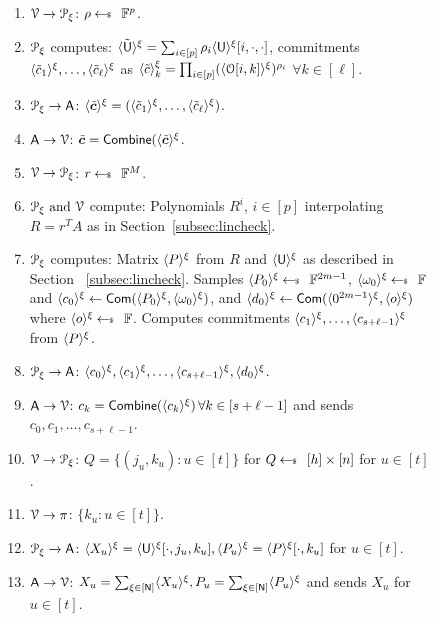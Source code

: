 \begin{figure*}[h!]
{\begin{framed}
			\begin{enumerate}[{\rm 1.}]
				\item $\verifier\rightarrow\distprover$: $\rho\sample \FF^p$.
				\item $\distprover$ computes: $\shr{\tilde{\ewit}} = \sum_{i\in [p]}\rho_i\shr{\ewit}[i,\cdot,\cdot]$, commitments $\shr{\tilde{c}_1},\ldots,\shr{\tilde{c}_\ell}$ as $\shr{\tilde{c}}_k = \prod_{i\in[p]}(\shr{\comoracle[i,k]})^{\rho_i}$ $\forall k\in[\ell]$.
				\item $\distprover\rightarrow\Ag$: $\shr{\tilde{\bm{c}}} = (\shr{\tilde{c}_1},\ldots,\shr{\tilde{c}_\ell})$.
				\item  {$\Ag\rightarrow\verifier$: $\tilde{\bm{c}}=\combine(\shr{\tilde{\bm{c}}}$.} %
				\item $\verifier\rightarrow\distprover$: $r\sample \FF^M$.
				\item $\distprover \text{ and }\verifier$ compute: Polynomials $R^i$, $i\in [p]$ interpolating $R=r^TA$	as in Section~\ref{subsec:lincheck}.
				\item $\distprover$ computes: Matrix $\shr{P}$ from $R$ and $\shr{\ewit}$ as described in Section ~\ref{subsec:lincheck}. Samples $\shr{P_0}\sample \FF^{2m-1}$, $\shr{\omega_0} \sample \FF$ and $\shr{c_0}\gets \comm(\shr{P_0},\shr{\omega_0})$,  and $\shr{d_0}\gets \comm(\shr{0^{2m-1}},\shr{o})$ where $\shr{o} \sample \FF$.
				Computes commitments $\shr{c_1},\ldots,\shr{c_{s+\ell-1}}$ from $\shr{P}$.
				\item $\distprover\rightarrow\Ag$: $\shr{c_0} ,\shr{c_1} ,\ldots, \shr{c_{s+\ell-1}}, \shr{d_0}$.
				\item  {$\Ag\rightarrow\verifier$: $c_k = \combine(\shr{c_k}) \, \forall k\in [s+\ell-1]$ and sends $c_0,c_1,\ldots,c_{s+\ell-1}$.}
				\item $\verifier\rightarrow\distprover$: $Q=\{(j_u,k_u):u\in [t]\}$ for $Q\sample [h]\times [n]$ for $u\in [t]$.
				\item $\verifier\rightarrow\pi$: $\{k_u:u\in [t]\}$.
				\item $\distprover\rightarrow\Ag$: $\shr{X_u}=\shr{\ewit}[\cdot,j_u,k_u],  \shr{P_u} = \shr{P}[\cdot,k_u]$ for $u\in [t]$.
				\item  {$\Ag\rightarrow\verifier$: $X_u = \sum_{\xi\in[\Num]} \shr{X_u}, P_u= \sum_{\xi\in [\Num]} \shr{P_u}$ and sends ${X_u}$ for $u\in [t]$.}

\end{enumerate}
\end{framed}}
\end{figure*}
